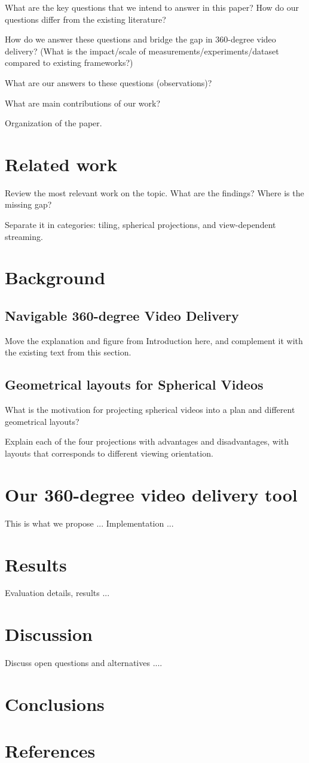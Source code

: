 What are the key questions that we intend to answer in this paper? How do our questions differ from the existing literature?

How do we answer these questions and bridge the gap in 360-degree video delivery? (What is the impact/scale of measurements/experiments/dataset compared to existing frameworks?)

What are our answers to these questions (observations)?

What are main contributions of our work?

Organization of the paper.

\section{Related work}

Review the most relevant work on the topic. What are the findings? Where is the missing gap?

Separate it in categories: tiling, spherical projections, and view-dependent streaming.

\section{Background}

\subsection{Navigable 360-degree Video Delivery}

Move the explanation and figure from Introduction here, and complement it with the existing text from this section.

\subsection{Geometrical layouts for Spherical Videos}

What is the motivation for projecting spherical videos into a plan and different geometrical layouts?

Explain each of the four projections with advantages and disadvantages, with layouts that corresponds to different viewing orientation.

\section{Our 360-degree video delivery tool}

This is what we propose ...
Implementation ...

\section{Results}

Evaluation details, results ...

\section{Discussion}

Discuss open questions and alternatives ....

\section{Conclusions}

\section{References}